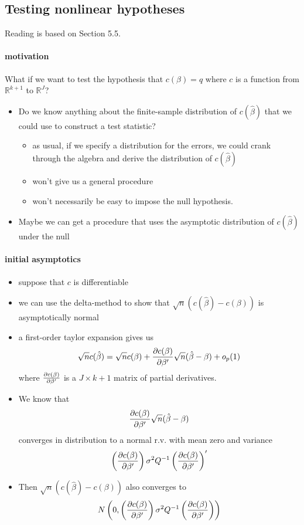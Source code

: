 \subsection{Testing nonlinear hypotheses}

     Reading is based on \citet{Gre_2011} Section 5.5.

\paragraph{motivation}
      What if we want to test the hypothesis that $c(\beta) = q$ where
      $c$ is a function from $\mathbb{R}^{k+1}$ to $\mathbb{R}^J$?
\begin{itemize}
\item Do we know anything about the finite-sample distribution of
        $c(\hat\beta)$ that we could use to construct a test statistic?
\begin{itemize}
\item as usual, if we specify a distribution for the errors, we
          could crank through the algebra and derive the distribution of
          $c(\hat\beta)$
\item won't give us a general procedure
\item won't necessarily be easy to impose the null hypothesis.
\end{itemize}
\item Maybe we can get a procedure that uses the asymptotic
        distribution of $c(\hat\beta)$ under the null
\end{itemize}

\paragraph{initial asymptotics}
\begin{itemize}
\item suppose that $c$ is differentiable
\item we can use the delta-method to show that
        $\sqrt{n}(c(\hat\beta) - c(\beta))$ is asymptotically normal
\item a first-order taylor expansion gives us
        \[ \sqrt{n} c(\hat\beta) = \sqrt{n} c(\beta) +
        {\partial c(\beta) \over \partial \beta'} \sqrt{n} (\hat\beta -
        \beta) + o_p(1) \]
        where $\partial c(\beta) \over \partial \beta'$ is a $J \times
        k+1$ matrix of partial derivatives.
\item We know that \[{\partial c(\beta) \over \partial \beta'}
        \sqrt{n} (\hat\beta - \beta)\] converges in distribution to a
        normal r.v. with mean zero and variance \[ \left({\partial
        c(\beta) \over \partial \beta'}\right) \sigma^2 Q^{-1}
        \left({\partial c(\beta) \over \partial \beta'}\right)'\]
\item Then $\sqrt{n} (c(\hat\beta) - c(\beta))$ also converges to \[
        N\left(0, \left({\partial
        c(\beta) \over \partial \beta'}\right) \sigma^2 Q^{-1}
        \left({\partial c(\beta) \over \partial \beta'}\right) \right)\]
\end{itemize}

